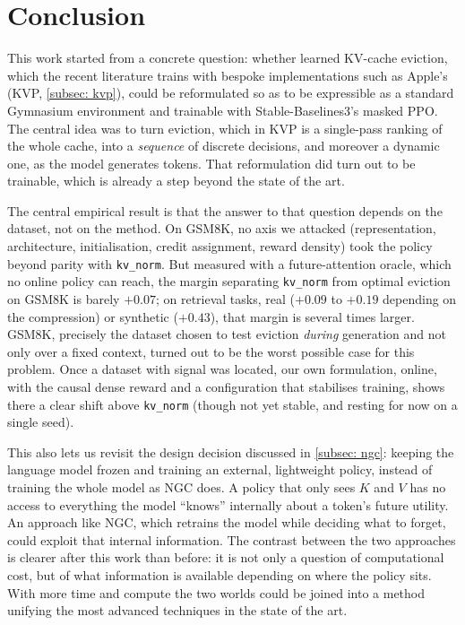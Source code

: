 \section{Conclusion} \label{section: conclusion}

This work started from a concrete question: whether learned KV-cache eviction, which the recent literature trains with bespoke implementations such as Apple's (KVP, \cref{subsec: kvp}), could be reformulated so as to be expressible as a standard Gymnasium environment and trainable with Stable-Baselines3's masked PPO. The central idea was to turn eviction, which in KVP is a single-pass ranking of the whole cache, into a \emph{sequence} of discrete decisions, and moreover a dynamic one, as the model generates tokens. That reformulation did turn out to be trainable, which is already a step beyond the state of the art.

The central empirical result is that the answer to that question depends on the dataset, not on the method. On GSM8K, no axis we attacked (representation, architecture, initialisation, credit assignment, reward density) took the policy beyond parity with \texttt{kv\_norm}. But measured with a future-attention oracle, which no online policy can reach, the margin separating \texttt{kv\_norm} from optimal eviction on GSM8K is barely $+0.07$; on retrieval tasks, real ($+0.09$ to $+0.19$ depending on the compression) or synthetic ($+0.43$), that margin is several times larger. GSM8K, precisely the dataset chosen to test eviction \emph{during} generation and not only over a fixed context, turned out to be the worst possible case for this problem. Once a dataset with signal was located, our own formulation, online, with the causal dense reward and a configuration that stabilises training, shows there a clear shift above \texttt{kv\_norm} (though not yet stable, and resting for now on a single seed).

This also lets us revisit the design decision discussed in \cref{subsec: ngc}: keeping the language model frozen and training an external, lightweight policy, instead of training the whole model as NGC does. A policy that only sees $K$ and $V$ has no access to everything the model ``knows'' internally about a token's future utility. An approach like NGC, which retrains the model while deciding what to forget, could exploit that internal information. The contrast between the two approaches is clearer after this work than before: it is not only a question of computational cost, but of what information is available depending on where the policy sits. With more time and compute the two worlds could be joined into a method unifying the most advanced techniques in the state of the art.


